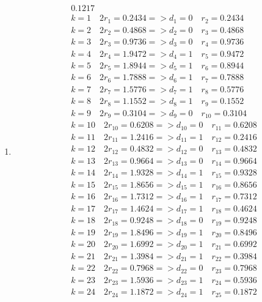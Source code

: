 \documentclass{article}
\begin{document}
\begin{enumerate}
\begin{enumerate}
\begin{align*}
        \end{align*}
    \item 
        \begin{align*}
        &0.1217 \\
        & k=1 \quad  2r_1 = 0.2434 => d_1 = 0 \quad r_2 = 0.2434 \\ 
        & k=2 \quad  2r_2 = 0.4868 => d_2 = 0 \quad r_3 = 0.4868  \\
        & k=3 \quad  2r_3 = 0.9736 => d_3 = 0 \quad r_4 = 0.9736  \\
        & k=4 \quad  2r_4 = 1.9472 => d_4 = 1 \quad r_5 = 0.9472  \\
        & k=5 \quad  2r_5 = 1.8944 => d_5 = 1 \quad r_6 = 0.8944  \\
        & k=6 \quad  2r_6 = 1.7888 => d_6 = 1 \quad r_7 = 0.7888  \\
        & k=7 \quad  2r_7 = 1.5776 => d_7 = 1 \quad r_8 = 0.5776  \\
        & k=8 \quad  2r_8 = 1.1552 => d_8 = 1 \quad r_9 = 0.1552  \\
        & k=9 \quad  2r_9 = 0.3104 => d_9 = 0 \quad r_{10} = 0.3104  \\
        & k=10 \quad  2r_{10} = 0.6208 => d_{10} = 0 \quad r_{11} = 0.6208  \\
        & k=11 \quad  2r_{11} = 1.2416 => d_{11} = 1 \quad r_{12} = 0.2416  \\
        & k=12 \quad  2r_{12} = 0.4832 => d_{12} = 0 \quad r_{13} = 0.4832  \\
        & k=13 \quad  2r_{13} = 0.9664 => d_{13} = 0 \quad r_{14} = 0.9664  \\
        & k=14 \quad  2r_{14} = 1.9328 => d_{14} = 1 \quad r_{15} = 0.9328  \\
        & k=15 \quad  2r_{15} = 1.8656 => d_{15} = 1 \quad r_{16} = 0.8656  \\
        & k=16 \quad  2r_{16} = 1.7312 => d_{16} = 1 \quad r_{17} = 0.7312  \\
        & k=17 \quad  2r_{17} = 1.4624 => d_{17} = 1 \quad r_{18} = 0.4624  \\
        & k=18 \quad  2r_{18} = 0.9248 => d_{18} = 0 \quad r_{19} = 0.9248  \\
        & k=19 \quad  2r_{19} = 1.8496 => d_{19} = 1 \quad r_{20} = 0.8496  \\
        & k=20 \quad  2r_{20} = 1.6992 => d_{20} = 1 \quad r_{21} = 0.6992  \\
        & k=21 \quad  2r_{21} = 1.3984 => d_{21} = 1 \quad r_{22} = 0.3984  \\
        & k=22 \quad  2r_{22} = 0.7968 => d_{22} = 0 \quad r_{23} = 0.7968  \\
        & k=23 \quad  2r_{23} = 1.5936 => d_{23} = 1 \quad r_{24} = 0.5936  \\
        & k=24 \quad  2r_{24} = 1.1872 => d_{24} = 1 \quad r_{25} = 0.1872  \\
        \end{align*}


\end{enumerate}
\end{enumerate}
\end{document}
